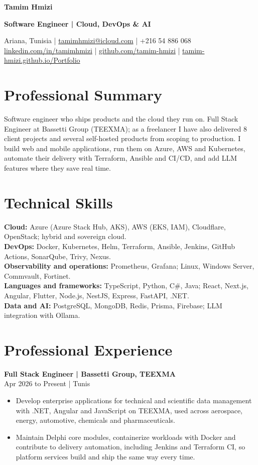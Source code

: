 \documentclass[11pt,a4paper]{article}
\newcommand{\role}[3]{\Needspace{5\baselineskip}\textbf{#1 | #2}\\#3\par}
\begin{document}
{\fontsize{25}{28}\selectfont\textbf{\color{accent}Tamim Hmizi}}\par
{\large\textbf{Software Engineer | Cloud, DevOps \& AI}}\par
Ariana, Tunisia | \href{mailto:tamimhmizi@icloud.com}{tamimhmizi@icloud.com} | +216 54 886 068\\
\href{https://www.linkedin.com/in/tamimhmizi/}{linkedin.com/in/tamimhmizi} | \href{https://github.com/tamim-hmizi}{github.com/tamim-hmizi} | \href{https://tamim-hmizi.github.io/Portfolio/}{tamim-hmizi.github.io/Portfolio}

\section{Professional Summary}
Software engineer who ships products and the cloud they run on. Full Stack Engineer at Bassetti Group (TEEXMA); as a freelancer I have also delivered 8 client projects and several self-hosted products from scoping to production. I build web and mobile applications, run them on Azure, AWS and Kubernetes, automate their delivery with Terraform, Ansible and CI/CD, and add LLM features where they save real time.

\section{Technical Skills}
\textbf{Cloud:} Azure (Azure Stack Hub, AKS), AWS (EKS, IAM), Cloudflare, OpenStack; hybrid and sovereign cloud.\\
\textbf{DevOps:} Docker, Kubernetes, Helm, Terraform, Ansible, Jenkins, GitHub Actions, SonarQube, Trivy, Nexus.\\
\textbf{Observability and operations:} Prometheus, Grafana; Linux, Windows Server, Commvault, Fortinet.\\
\textbf{Languages and frameworks:} TypeScript, Python, C\#, Java; React, Next.js, Angular, Flutter, Node.js, NestJS, Express, FastAPI, .NET.\\
\textbf{Data and AI:} PostgreSQL, MongoDB, Redis, Prisma, Firebase; LLM integration with Ollama.

\section{Professional Experience}
\role{Full Stack Engineer}{Bassetti Group, TEEXMA}{Apr 2026 to Present | Tunis}
\begin{itemize}
\item Develop enterprise applications for technical and scientific data management with .NET, Angular and JavaScript on TEEXMA, used across aerospace, energy{}, automotive, chemicals and pharmaceuticals.
\item Maintain Delphi core modules, containerize workloads with Docker and contribute to delivery automation, including Jenkins and Terraform CI, so platform services build and ship the same way every time.
\end{itemize}
\end{document}
